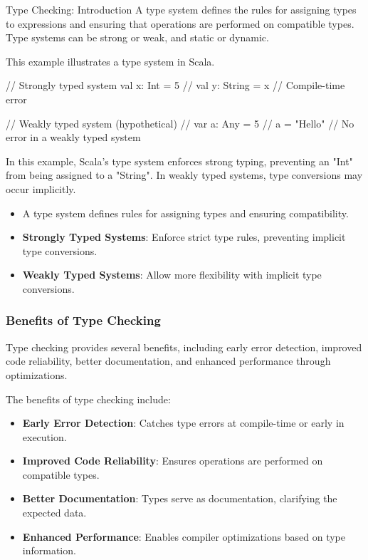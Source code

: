 \begin{notes}{Type Checking: Introduction}
    A type system defines the rules for assigning types to expressions and ensuring that operations are performed on compatible types. Type systems can be strong or weak, and static or dynamic.
    
    \begin{highlight}
    
        This example illustrates a type system in Scala.
    
    \begin{code}[Scala]
    // Strongly typed system
    val x: Int = 5
    // val y: String = x  // Compile-time error
    
    // Weakly typed system (hypothetical)
    // var a: Any = 5
    // a = "Hello"  // No error in a weakly typed system
    \end{code}
    
        In this example, Scala's type system enforces strong typing, preventing an "Int" from being assigned to a "String". In weakly typed systems, type conversions may occur implicitly.
    
        \begin{itemize}
            \item A type system defines rules for assigning types and ensuring compatibility.
            \item \textbf{Strongly Typed Systems}: Enforce strict type rules, preventing implicit type conversions.
            \item \textbf{Weakly Typed Systems}: Allow more flexibility with implicit type conversions.
        \end{itemize}
    
    \end{highlight}
    
    \subsubsection*{Benefits of Type Checking}
    
    Type checking provides several benefits, including early error detection, improved code reliability, better documentation, and enhanced performance through optimizations.
    
    \begin{highlight}
    
        The benefits of type checking include:
    
        \begin{itemize}
            \item \textbf{Early Error Detection}: Catches type errors at compile-time or early in execution.
            \item \textbf{Improved Code Reliability}: Ensures operations are performed on compatible types.
            \item \textbf{Better Documentation}: Types serve as documentation, clarifying the expected data.
            \item \textbf{Enhanced Performance}: Enables compiler optimizations based on type information.
        \end{itemize}
    

\end{highlight}
\end{notes}
